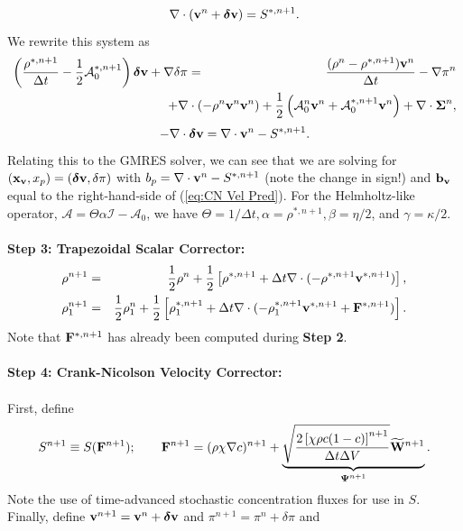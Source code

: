 \documentclass[final]{siamltex}
\def\bb {{\bf b}}
\def\Fb {{\bf F}}
\def\vb {{\bf v}}
\def\Wb {{\bf W}}
\def\xb {{\bf x}}
\def\deltab {\boldsymbol{\delta}}
\def\Psib   {\boldsymbol{\Psi}}
\def\Sigmab {\boldsymbol{\Sigma}}
\def\half   {\frac{1}{2}}
\begin{document}
\begin{equation}
\nabla\cdot(\vb^n+\deltab\vb) = S^{*,n+1}.
\end{equation}
We rewrite this system as
\begin{eqnarray}
\left(\frac{\rho^{*,n+1}}{\Delta t} - \half\mathcal{A}_0^{*,n+1}\right)\deltab\vb + \nabla\delta\pi &=& \frac{(\rho^n-\rho^{*,n+1})\vb^n}{\Delta t} -\nabla\pi^n\nonumber\\
&&\hspace{-0.5in}+ \nabla\cdot(-\rho^n\vb^n\vb^n) + \half\left(\mathcal{A}_0^n\vb^n + \mathcal{A}_0^{*,n+1}\vb^n\right) + \nabla\cdot\Sigmab^n,\label{eq:CN Vel Pred}
\end{eqnarray}
\begin{equation}
-\nabla\cdot\deltab\vb = \nabla\cdot\vb^n - S^{*,n+1}.
\end{equation}
Relating this to the GMRES solver, we can see that we are solving for 
$(\xb_\vb,x_p) = (\deltab\vb,\delta\pi)$ with $b_p = \nabla\cdot\vb^n-S^{*,n+1}$ (note the change in sign!) 
and $\bb_\vb$ equal to the right-hand-side of (\ref{eq:CN Vel Pred}).  For the Helmholtz-like operator, 
$\mathcal{A}=\Theta\alpha\mathcal{I} - \mathcal{A}_0$, we have $\Theta=1/\Delta t, \alpha=\rho^{*,n+1}, 
\beta=\eta/2$, and $\gamma=\kappa/2$.\\ \\
{\bf Step 3: Trapezoidal Scalar Corrector:}
\begin{eqnarray}
\rho^{n+1} &=& \half\rho^n + \half\left[\rho^{*,n+1} + \Delta t\nabla\cdot(-\rho^{*,n+1}\vb^{*,n+1})\right],\\
\rho_1^{n+1} &=& \half\rho_1^n + \half\left[\rho_1^{*,n+1} + \Delta t\nabla\cdot(-\rho_1^{*,n+1}\vb^{*,n+1} + \Fb^{*,n+1})\right].
\end{eqnarray}
Note that $\Fb^{*,n+1}$ has already been computed during {\bf Step 2}.\\ \\
{\bf Step 4: Crank-Nicolson Velocity Corrector:}\\ \\
First, define
\begin{equation}
S^{n+1} \equiv S(\Fb^{n+1});
\qquad
\Fb^{n+1} = (\rho\chi\nabla c)^{n+1} + \underbrace{\sqrt{\frac{2\left[\chi\rho c(1-c)\right]^{n+1}}{\Delta t\Delta V}}\widetilde\Wb^{n+1}}_{\Psib^{n+1}}.
\end{equation}
Note the use of time-advanced stochastic concentration fluxes for use in $S$.  Finally, 
define $\vb^{n+1} = \vb^n + \deltab\vb$ and $\pi^{n+1} = \pi^n + \delta\pi$ and
\end{document}

